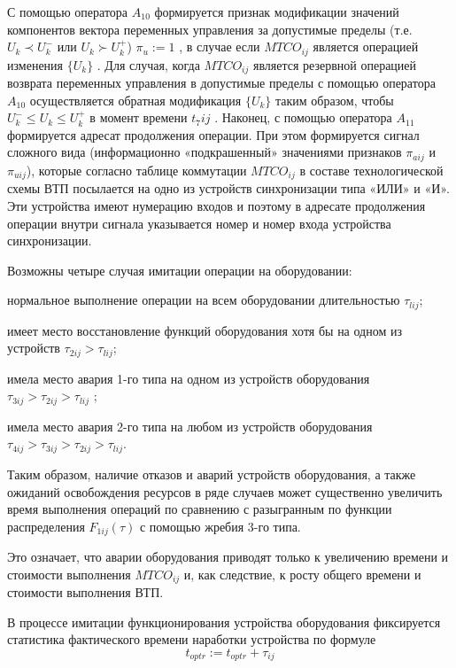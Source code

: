 С помощью оператора $A_{10}$ формируется признак модификации значений компонентов вектора переменных управления за допустимые пределы (т.е. $U_k \prec U_k^-$ или $U_k \succ  U_k^+$)  $\pi_{u}:=1$ ,	 в случае если $MTCO_{ij}$ является операцией  изменения $\{U_k\}$ . Для случая, когда $MTCO_{ij}$ является резервной операцией возврата переменных управления в допустимые пределы с помощью оператора $A_{10}$ осуществляется обратная модификация $\{U_k\}$ таким образом, чтобы $U_k^-  \leq  U_k  \leq U_k^+$   в момент времени $t_7ij$ . Наконец, с помощью оператора $A_{11}$ формируется адресат продолжения операции. При этом формируется сигнал сложного вида (информационно «подкрашенный» значениями признаков $\pi_{aij}$ и $\pi_{uij}$), которые согласно таблице коммутации $MTCO_{ij}$ в составе технологической схемы ВТП посылается на одно из устройств синхронизации типа «ИЛИ» и «И».  Эти устройства имеют нумерацию входов и поэтому в  адресате продолжения операции внутри сигнала указывается номер и номер входа устройства синхронизации.

Возможны четыре случая имитации операции на оборудовании:
\begin{textitemize}
    \item нормальное выполнение операции на всем оборудовании длительностью $\tau_{lij}$;
    \item имеет место восстановление функций оборудования хотя бы на одном из устройств $\tau_{2ij}>\tau_{lij}$;
    \item имела место авария 1-го типа на одном из устройств оборудования $\tau_{3ij}>\tau_{2ij}>\tau_{lij}$ ;
    \item имела место авария 2-го типа на любом из устройств оборудования  $\tau_{4ij}>\tau_{3ij}>\tau_{2ij}>\tau_{lij}$.
\end{textitemize}

Таким образом, наличие отказов и аварий устройств оборудования, а также ожиданий освобождения ресурсов в ряде случаев может существенно увеличить время выполнения операций по сравнению с разыгранным по функции распределения $F_{1ij}(\tau)$ с помощью жребия 3-го типа.

Это означает, что аварии оборудования приводят только к увеличению времени и стоимости выполнения $MTCO_{ij}$ и, как следствие, к росту общего времени и стоимости выполнения ВТП.



В процессе имитации функционирования устройства оборудования фиксируется статистика фактического времени наработки устройства по формуле
\begin{equation*}
		t_{optr}:=t_{optr}+\tau_{ij}
\end{equation*}


